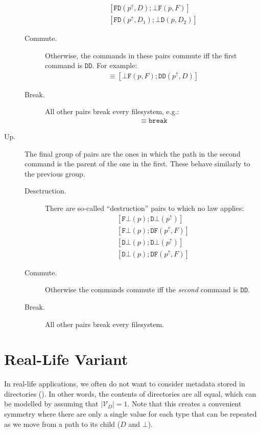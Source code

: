\documentclass[12pt]{article}
\newcommand{\setvx}[1]{\mathcal{V}_{#1}}
\newcommand{\setd}{\setvx{D}}
\newcommand{\empt}{\bot}
\newcommand{\pp}{p^\uparrow} %
\newcommand{\cbrk}{\mathtt{break}}
\newcommand{\fscommand}[2]{{#1#2}}
\newcommand{\fsregcommandchar}[1]{\mathtt{#1}}
\newcommand{\fsregcommand}[2]{\fscommand{\fsregcommandchar{#1}}{\fsregcommandchar{#2}}}
\newcommand{\cbf}{\fsregcommand{\empt}{F}}
\newcommand{\cbd}{\fsregcommand{\empt}{D}}
\newcommand{\cfb}{\fsregcommand{F}{\empt}}
\newcommand{\cfd}{\fsregcommand{F}{D}}
\newcommand{\cdb}{\fsregcommand{D}{\empt}}
\newcommand{\cdf}{\fsregcommand{D}{F}}
\newcommand{\cdd}{\fsregcommand{D}{D}}
\begin{document}
\begin{description}
\begin{description}
\begin{gather*}
            [\cfd(\pp, D); \cbf(p, F)] \\
            [\cfd(\pp, D_1); \cbd(p, D_2)]
   \end{gather*}
   \item[Commute.] Otherwise, the commands in these pairs commute iff the first command is $\cdd$. For example:
   \begin{gather*}
   [\cdd(\pp, D); \cbf(p, F)] \equiv [\cbf(p, F); \cdd(\pp, D)]
   \end{gather*}
   \item[Break.] All other pairs break every filesystem, e.g.:
   \begin{gather*}
   [\cdf(\pp, F); \cbd(p, D)] \equiv \cbrk
   \end{gather*}
   \end{description}
%
\item[Up.]
The final group of pairs are the ones in which the path in the second
command is the parent of the one in the first.
These behave similarly to the previous group. 
   \begin{description}
   \item[Desctruction.] There are
   so-called ``destruction'' pairs to which no law applies:
   \begin{gather*}
            [\cfb(p); \cdb(\pp)] \\
            [\cfb(p); \cdf(\pp, F)] \\
            [\cdb(p); \cdb(\pp)] \\
            [\cdb(p); \cdf(\pp, F)]
   \end{gather*}
   \item[Commute.] Otherwise the commands commute iff the \emph{second} command is $\cdd$.
   \item[Break.] All other pairs break every filesystem.
   \end{description}
\end{description}

\section{Real-Life Variant}

In real-life applications, we often do not want to consider metadata stored in
directories (\cite{BZ}). In other words, the contents of directories are all equal,
which can be modelled by assuming that $|\setd|=1$.
Note that this creates a convenient symmetry where there are only a single value
for each type that can be repeated as we move from a path to its child ($D$ and $\empt$).
\end{document}
